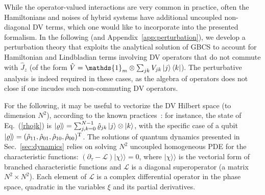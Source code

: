 \documentclass[%
reprint,
superscriptaddress,
nofootinbib,
 amsmath,amssymb,
prx,
floatfix,
]{revtex4-2}
\newcommand{\dket}[1]{\lvert #1 \rangle\!\rangle}
\begin{document}
While the operator-valued interactions are very common in practice, often the Hamiltonians and noises of hybrid systems have additional uncoupled non-diagonal DV terms, which one would like to incorporate into the presented formalism. In the following (and Appendix~\ref{app:perturbation}), we develop a perturbation theory that exploits the analytical solution of GBCS to account for Hamiltonian and Lindbladian terms involving DV operators that do not commute with $\hat{J}_z$ (of the form $\hat{V} = \mathds{1}_m \otimes \sum_{jk} V_{jk} \ket{j} \bra{k}$). The perturbative analysis is indeed required in these cases, as the algebra of operators does not close if one incudes such non-commuting DV operators. 

For the following, it may be useful to vectorize the DV Hilbert space (to dimension $N^2$), according to the known practices~\cite{fundamentals_gyamfi_2020}: for instance, the state of Eq.~(\ref{rhojk}) is $\dket{\varrho} = \sum_{j, k  = 0}^{N-1} \hat{\varrho}_{jk} \ket{j} \otimes \ket{k}$, with the specific case of a qubit $\dket{\varrho} = (\hat{\rho}_{11}, \hat{\rho}_{01}, \hat{\rho}_{10}, \hat{\rho}_{00})^{\rm T}$. 
The solutions of quantum dynamics presented in Sec.~\ref{sec:dynamics} relies on solving $N^2$ uncoupled homogeneous PDE for the characteristic functions: $\left( \partial_\tau - \mathcal{L} \right) \dket{\chi} = 0$, where $\dket{\chi}$ is the vectorial form of branched characteristic functions and $\mathcal{L}$ is a diagonal superoperator (a matrix $N^2 \times N^2$). Each element of $\mathcal{L}$ is a complex differential operator in the phase space, quadratic in the variables $\xi$ and its partial derivatives. 
\end{document}
